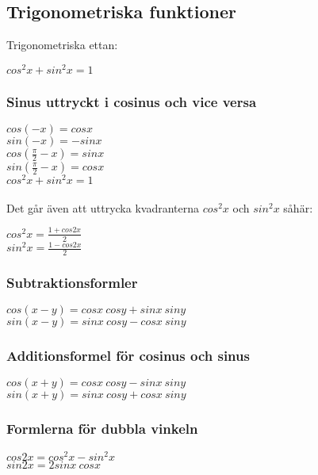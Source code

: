 \documentclass[11pt]{article}
\begin{document}
\subsection{Trigonometriska funktioner}
Trigonometriska ettan: 
\begin{center}
$cos^2x + sin^2 x = 1$
\end{center}
\subsubsection{Sinus uttryckt i cosinus och vice versa}
$cos(-x) = cosx $ 	\\
$sin(-x) = -sinx $ 	\\
$cos(\frac{\pi}{2} -x) = sinx$ \\
$sin(\frac{\pi}{2} -x) = cosx$ \\
$cos^2x + sin^2x = 1$
\\ \\
Det går även att uttrycka kvadranterna $cos^2 x $ och $ sin^2 x$ såhär: 
\begin{center}
$cos^2x = \frac{1+ cos2x}{2}$ \\
$sin^2x = \frac{1-cos2x}{2}$
\end{center}
\subsubsection{Subtraktionsformler}
$ cos(x-y) = cosx~cosy + sinx~siny$ \\
$ sin(x-y) = sinx~cosy - cosx~siny$ 

\subsubsection{Additionsformel för cosinus och sinus}
$cos(x+y) = cosx~cosy-sinx~siny$ \\
$sin(x+y) = sinx~cosy + cosx~siny$ 

\subsubsection{Formlerna för dubbla vinkeln}
$ cos2x = cos^2x - sin^2x$ \\
$ sin2x = 2sinx~cosx $
\end{document}
